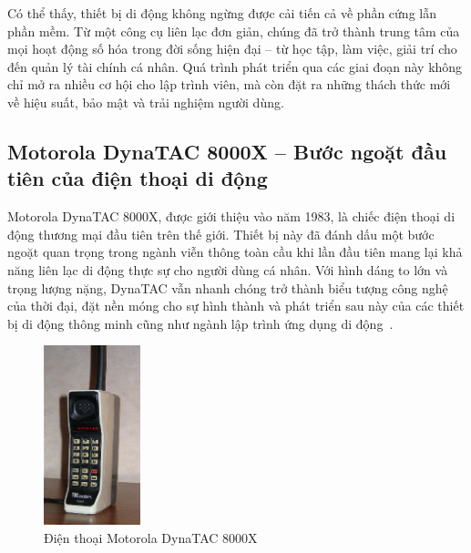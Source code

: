 \begin{flushleft}
  \hspace*{0.8cm}Có thể thấy, thiết bị di động không ngừng được cải tiến cả về phần cứng lẫn phần mềm. Từ một công cụ liên lạc đơn giản, chúng đã trở thành trung tâm của mọi hoạt động số hóa trong đời sống hiện đại – từ học tập, làm việc, giải trí cho đến quản lý tài chính cá nhân. Quá trình phát triển qua các giai đoạn này không chỉ mở ra nhiều cơ hội cho lập trình viên, mà còn đặt ra những thách thức mới về hiệu suất, bảo mật và trải nghiệm người dùng.
\end{flushleft}

\subsection{Motorola DynaTAC 8000X – Bước ngoặt đầu tiên của điện thoại di động}
\renewcommand{\labelitemi}{--}    
\begin{flushleft}
    \hspace*{0.8cm}Motorola DynaTAC 8000X, được giới thiệu vào năm 1983, là chiếc điện thoại di động thương mại đầu tiên trên thế giới. Thiết bị này đã đánh dấu một bước ngoặt quan trọng trong ngành viễn thông toàn cầu khi lần đầu tiên mang lại khả năng liên lạc di động thực sự cho người dùng cá nhân. Với hình dáng to lớn và trọng lượng nặng, DynaTAC vẫn nhanh chóng trở thành biểu tượng công nghệ của thời đại, đặt nền móng cho sự hình thành và phát triển sau này của các thiết bị di động thông minh cũng như ngành lập trình ứng dụng di động~\cite{motorola1983}.
\end{flushleft}

\begin{figure}[h]
  \centering
  \includegraphics[width=0.25\textwidth]{images/DynaTAC8000X.png}
  \caption{Điện thoại Motorola DynaTAC 8000X}
  \label{fig:fig4}
\end{figure}


